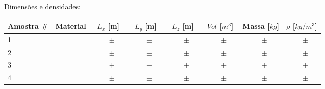 \documentclass[a4paper,12pt]{article}  %
\begin{document}
Dimensões e densidades:
\begin{center}
	\begin{tabular}{|l|c|c|c|c|c|c|c|}
	\hline
	 Amostra \# & Material  &  $L_x$ [m]  &   $L_y$ [m]  &  $L_z$ [m]  & $Vol$ [$m^3$]  & Massa [$kg$] & $\rho$ [$kg/m^3$] \\
	\hline \hline
	  1   &   & $ \quad  \quad \pm \quad $ &  $ \quad \quad  \pm \quad $ & $ \quad \quad  \pm \quad $ & $ \quad  \quad \pm \quad $ & $ \quad \quad  \pm \quad $ & $ \quad  \quad \pm \quad $ \\ \hline
	  2   &   & $ \quad  \quad \pm \quad $ &  $ \quad \quad  \pm \quad $ & $ \quad  \quad \pm \quad $ & $ \quad  \quad \pm \quad $ & $ \quad  \quad \pm \quad $ & $ \quad \quad  \pm \quad $ \\ \hline
	  3   &   & $ \quad  \quad \pm \quad $ &  $ \quad  \quad \pm \quad $ & $ \quad  \quad \pm \quad $ & $ \quad  \quad \pm \quad $ & $ \quad  \quad \pm \quad $ & $ \quad \quad  \pm \quad $ \\ \hline
	  4   &   & $ \quad  \quad \pm \quad $ &  $ \quad \quad  \pm \quad $ & $ \quad \quad  \pm \quad $ & $ \quad  \quad \pm \quad $ & $ \quad \quad  \pm \quad $ & $ \quad \quad  \pm \quad $ \\ \hline
				\end{tabular}
\end{center}

\end{document}
